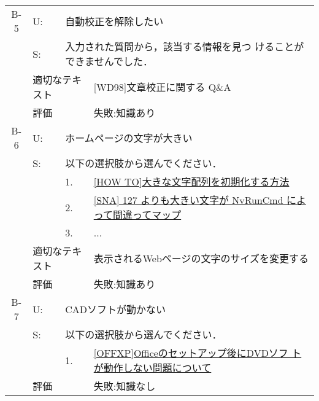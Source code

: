 \begin{table}
\begin{center}
\begin{tabular}{c|llp{10cm}}
   B-5 & U: & \multicolumn{2}{l}{自動校正を解除したい} \\
       & S: & \multicolumn{2}{l}{入力された質問から，該当する情報を見つ
       けることができませんでした．} \\ \cline{2-4}
       & \multicolumn{2}{l}{適切なテキスト} & [WD98]文章校正に関する Q\&A \\ \cline{2-4}
       & \multicolumn{2}{l}{評価} & 失敗:知識あり \\ \hline


   B-6 & U: & \multicolumn{2}{l}{ホームページの文字が大きい} \\
       & S: & \multicolumn{2}{l}{以下の選択肢から選んでください．} \\
       &    & 1.    & \underline{[HOW TO]大きな文字配列を初期化する方法} \\
       &    & 2.    & \underline{[SNA] 127 よりも大きい文字が NvRunCmd によって間違ってマップ} \\
       &    & 3.    & ... \\ \cline{2-4}
       & \multicolumn{2}{l}{適切なテキスト} & 表示されるWebページの文字のサイズを変更する \\ \cline{2-4}
       & \multicolumn{2}{l}{評価} & 失敗:知識あり \\ \hline

   B-7 & U: & \multicolumn{2}{l}{CADソフトが動かない} \\
       & S: & \multicolumn{2}{l}{以下の選択肢から選んでください．} \\
       &    & 1.    & \underline{[OFFXP]Officeのセットアップ後にDVDソフ
       トが動作しない問題について} \\ \cline{2-4}
       & \multicolumn{2}{l}{評価} & 失敗:知識なし \\ \hline

  \end{tabular}

 \end{center}
\end{table}



